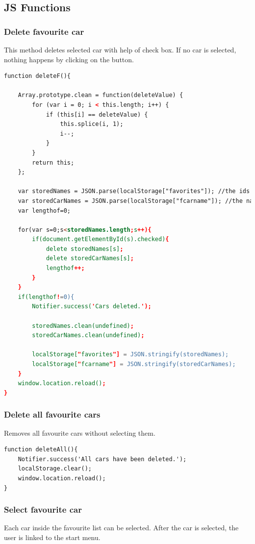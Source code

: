 \subsection{JS Functions}
\subsubsection{Delete favourite car}
This method deletes selected car with help of check box. If no car is selected, nothing happens by clicking on the button.
\\

\begin{lstlisting}[language=html, caption= 
Delete function,captionpos=b]
function deleteF(){
	
	Array.prototype.clean = function(deleteValue) {
  		for (var i = 0; i < this.length; i++) {
    		if (this[i] == deleteValue) {         
      			this.splice(i, 1);
				i--;
			}
		}
		return this;
	};
	
	var storedNames = JSON.parse(localStorage["favorites"]); //the ids of cars
    var storedCarNames = JSON.parse(localStorage["fcarname"]); //the names of cars
	var lengthof=0;

	for(var s=0;s<storedNames.length;s++){
		if(document.getElementById(s).checked){
			delete storedNames[s];
            delete storedCarNames[s];
			lengthof++;
		}		
	}
	if(lengthof!=0){
		Notifier.success('Cars deleted.');
	
		storedNames.clean(undefined);
		storedCarNames.clean(undefined);

		localStorage["favorites"] = JSON.stringify(storedNames);
		localStorage["fcarname"] = JSON.stringify(storedCarNames);
	}
	window.location.reload();
}
\end{lstlisting}

\subsubsection{Delete all favourite cars}
Removes all favourite cars without selecting them.

\begin{lstlisting}[language=html, caption= 
Delete all function,captionpos=b]
function deleteAll(){
    Notifier.success('All cars have been deleted.');
	localStorage.clear();
    window.location.reload();
}
\end{lstlisting}

\subsubsection{Select favourite car}
Each car inside the favourite list can be selected. After the car is selected, the user is linked to the start menu.
\\

